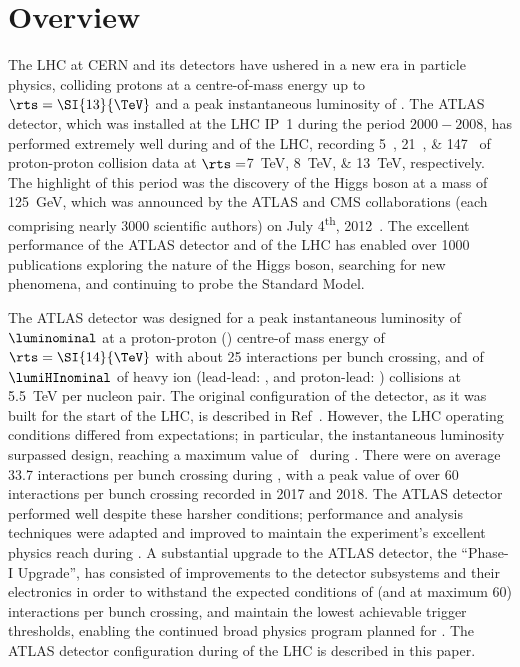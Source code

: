 \documentclass[cernpreprint, atlasdraft=false, UKenglish,british,orcidlogo, texmf, orcidlogo]{atlasdoc}
\author{The ATLAS Collaboration}
\begin{document}
 
\maketitle
 
\tableofcontents
 
\clearpage
\newpage
 
\section{Overview} 
 

 
The \gls{LHC} at CERN and its detectors have ushered in a new era in particle physics, colliding protons at a centre-of-mass energy up to $\rts = \SI{13}{\TeV}$ and a peak instantaneous luminosity of \lumiruntwopeak. The ATLAS detector, which was installed at the \gls{LHC} \gls{IP}~1 during the period $2000-2008$, has performed extremely well during \RunOne and \RunTwo of the \gls{LHC}, recording \SIlist{5;21;147}{\ifb} of proton-proton collision data at $\rts = $\SIlist{7;8;13}{\TeV}, respectively. The highlight of this period was the discovery of the Higgs boson at a mass of \SI{125}{\GeV}, which was announced by the ATLAS and \acrshort{CMS} collaborations (each comprising nearly \num{3000} scientific authors) on July 4\textsuperscript{th}, 2012~\cite{HIGG-2012-27,CMS-HIG-12-028}. The excellent performance of the ATLAS detector and of the \gls{LHC} has enabled over \num{1000} publications exploring the nature of the Higgs boson, searching for new phenomena, and continuing to probe the Standard Model.
 
The ATLAS detector was designed for a peak instantaneous luminosity of $\luminominal$ at a proton-proton (\pp) centre-of mass energy of $\rts=\SI{14}{\TeV}$ with about \num{25} interactions per bunch crossing, and of $\lumiHInominal$ of heavy ion (lead-lead: \PbPb, and proton-lead: \pPb) collisions at \SI{5.5}{\TeV} per nucleon pair. The original configuration of the detector, as it was built for the start of the \gls{LHC}, is described in Ref~\cite{PERF-2007-01}. However, the \gls{LHC} operating conditions differed from expectations; in particular, the instantaneous luminosity surpassed design, reaching a maximum value of \lumiruntwopeak\ during \RunTwo. There were on average \num{33.7} interactions per bunch crossing during \RunTwo, with a peak value of over \num{60} interactions per bunch crossing recorded in 2017 and 2018.
The ATLAS detector performed well despite these harsher conditions; performance and analysis techniques were adapted and improved to maintain the experiment's excellent physics reach during \RunTwo. A substantial upgrade to the ATLAS detector, the ``Phase-I Upgrade'', has consisted of improvements to the detector subsystems and their electronics in order to withstand the expected \RunThr conditions of
\murunthree (and at maximum \num{60})
interactions per bunch crossing, and maintain the lowest achievable trigger thresholds, enabling the continued broad physics program planned for \RunThr.
The ATLAS detector configuration during \RunThr of the \gls{LHC} is described in this paper.
 
\end{document}

